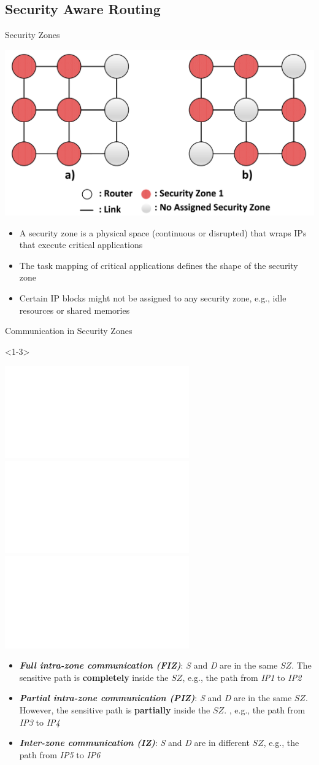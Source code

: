 \subsection{Security Aware Routing}
\begin{frame}{Security Zones}
	\begin{center}
		\includegraphics[width=0.60\linewidth]{images/secure_routing/security-zones-shapes.pdf}
	\end{center}
	\begin{itemize}
		\item<only@1> A security zone is a physical space (continuous or disrupted) that wraps IPs that execute critical applications
		
		\item<only@1> The task mapping of critical applications defines the shape of the security zone
		
		\item<only@1> Certain IP blocks might not be assigned to any security zone, e.g., idle resources or shared memories
	\end{itemize}
\end{frame}
\begin{frame}[t]{Communication in Security Zones}
	\begin{onlyenv}<1-3>
		\begin{center}
			\includegraphics<1>[width=0.85\linewidth]{images/secure_routing/security-zones-fiz.pdf}
			\includegraphics<2>[width=0.85\linewidth]{images/secure_routing/security-zones-piz.pdf}
			\includegraphics<3>[width=0.85\linewidth]{images/secure_routing/security-zones-iz.pdf}
		\end{center}
	\end{onlyenv}
	\begin{itemize}
		\item<only@1> \textit{\textbf{Full intra-zone communication (FIZ)}}: \emph{S} and \emph{D} are in the same $SZ$. The sensitive path is \textbf{completely} inside the $SZ$, e.g., the path from \emph{IP1} to \emph{IP2}
		
		\item<only@2> \textbf{\textit{Partial intra-zone communication (PIZ)}}: \emph{S} and \emph{D} are in the same $SZ$. However, the sensitive path is \textbf{partially} inside the $SZ$. , e.g., the path from \emph{IP3} to \emph{IP4}
		
		\item<only@3> \textbf{\textit{Inter-zone communication (IZ)}}: \emph{S} and \emph{D} are in different $SZ$, e.g., the path from \emph{IP5} to \emph{IP6}
	\end{itemize}
\end{frame}

